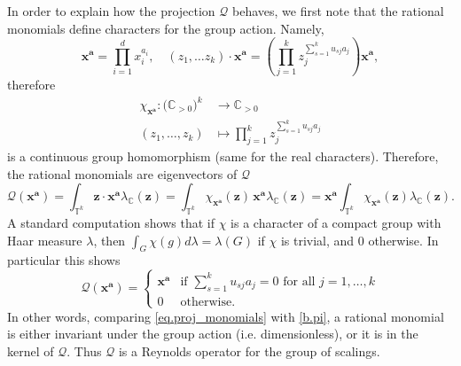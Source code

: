 \documentclass[twoside,11pt]{article}
\begin{document}
In order to explain how the projection $\mathcal Q$ behaves, we first note that the rational monomials define characters for the group action. Namely,
\begin{equation}
\mathbf x^{\mathbf a} = \prod_{i=1}^d x_i^{a_i}, \quad (z_1,\ldots z_k)\cdot \mathbf x^{\mathbf a} = (\prod_{j=1}^k z_j^{\sum_{s=1}^k {u_{sj}}a_j})\mathbf x^{\mathbf a},
\end{equation}
therefore 
\begin{align}
\chi_{\mathbf x^{\mathbf a}}: \mathbb (\mathbb C_{>0})^k &\to \mathbb C_{>0} \\
(z_1, \ldots, z_k) &\mapsto \prod_{j=1}^k z_j^{\sum_{s=1}^k {u_{sj}}a_j} 
\end{align}
is a continuous group homomorphism (same for the real characters). 
Therefore, the rational monomials are eigenvectors of $\mathcal Q$
\begin{equation}
\mathcal Q (\mathbf x^{\mathbf a}) = \int_{\mathbb T^k} 
\mathbf z \cdot \mathbf x^{\mathbf a} \lambda_{\mathbb C}(\mathbf z)
= 
\int_{\mathbb T^k} \chi_{\mathbf x^{\mathbf a}} (\mathbf z) \, \mathbf x^{\mathbf a} \lambda_{\mathbb C}(\mathbf z) 
= 
 \mathbf x^{\mathbf a} \int_{\mathbb T^k} \chi_{\mathbf x^{\mathbf a}} (\mathbf z) \lambda_{\mathbb C}(\mathbf z).
\end{equation}
A standard computation shows that if $\chi$ is a character of a compact group with Haar measure $\lambda$, then $\int_G \chi(g) d\lambda = \lambda(G)$ if $\chi$ is trivial, and 0 otherwise. In particular this shows
\begin{equation}
\mathcal Q(\mathbf x^{\mathbf a}) = \left \{
\begin{matrix} 
\mathbf x^{\mathbf a} & \text{if } \sum_{s=1}^k u_{sj} a_j =0 \text{ for all } j=1,\ldots, k
\\
0 & \text{otherwise.}
\end{matrix}
\right. \label{eq.proj_monomials}
\end{equation}
 In other words, comparing \eqref{eq.proj_monomials} with \eqref{b.pi}, a rational monomial is either invariant under the group action (i.e. dimensionless), or it is in the kernel of $\mathcal Q$. Thus $\mathcal Q$ is a Reynolds operator for the group of scalings.
\end{document}
